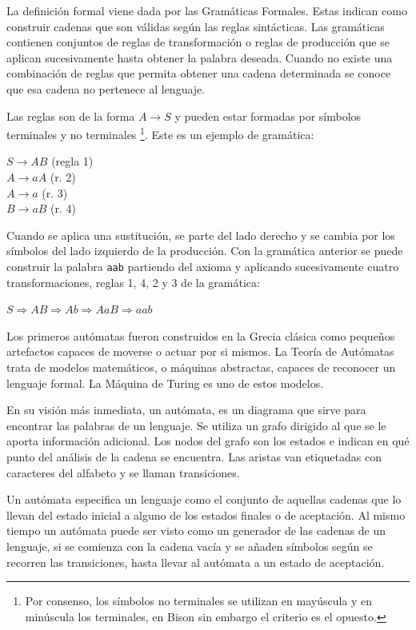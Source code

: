 
La definición formal viene dada por las Gramáticas Formales. Estas indican como construir cadenas que son válidas según las reglas sintácticas. Las gramáticas contienen conjuntos de reglas de transformación o reglas de producción que se aplican sucesivamente hasta obtener la palabra deseada. Cuando no existe una combinación de reglas que permita obtener una cadena determinada se conoce que esa cadena no pertenece al lenguaje.

Las reglas son de la forma $A\rightarrow S$ y pueden estar formadas por símbolos terminales y no terminales \footnote{Por consenso, los símbolos no terminales se utilizan en mayúscula y en minúscula los terminales, en Bison sin embargo el criterio es el opuesto.}. Este es un ejemplo de gramática:
\begin{center}
$S\rightarrow AB$ (regla 1) \\
$A\rightarrow aA$ (r. 2) \\
$A\rightarrow a$ (r. 3) \\
$B\rightarrow aB$ (r. 4) \\
\end{center}

Cuando se aplica una sustitución, se parte del lado derecho y se cambia por los símbolos del lado izquierdo de la producción. Con la gramática anterior se puede construir la palabra \verb|aab| partiendo del axioma y aplicando sucesivamente cuatro transformaciones, reglas 1, 4, 2 y 3 de la gramática:

\begin{center}
$S\Rightarrow AB\Rightarrow Ab \Rightarrow AaB \Rightarrow aab$
\end{center}


Los primeros autómatas fueron construidos en la Grecia clásica como pequeños artefactos capaces de moverse o actuar por si mismos. La Teoría de Autómatas trata de modelos matemáticos, o máquinas abstractas, capaces de reconocer un lenguaje formal. La Máquina de Turing es uno de estos modelos.

En su visión más inmediata, un autómata, es un diagrama que sirve para encontrar las palabras de un lenguaje. Se utiliza un grafo dirigido al que se le aporta información adicional. Los nodos del grafo son los estados e indican en qué punto del análisis de la cadena se encuentra. Las aristas van etiquetadas con caracteres del alfabeto y se llaman transiciones.

Un autómata especifica un lenguaje como el conjunto de aquellas cadenas que lo llevan del estado inicial a alguno de los estados finales o de aceptación. Al mismo tiempo un autómata puede ser visto como un generador de las cadenas de un lenguaje, si se comienza con la cadena vacía y se añaden símbolos según se recorren las transiciones, hasta llevar al autómata a un estado de aceptación.

